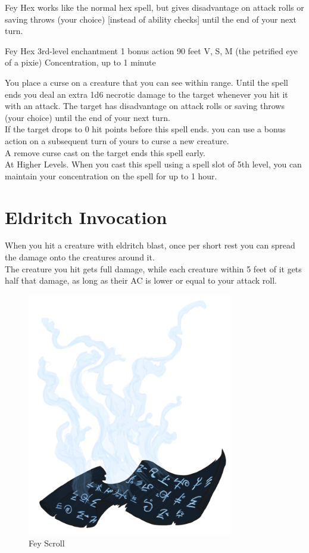 \documentclass[letter,10pt,twocolumn,openany]{dndbook}
\begin{document}
Fey Hex works like the normal hex spell, but gives disadvantage on attack rolls or saving throws (your choice) [instead of ability checks] until the end of your next turn.

\DndSpellHeader
  {Fey Hex}
  {3rd-level enchantment}
  {1 bonus action}
  {90 feet}
  {V, S, M (the petrified eye of a pixie)}
  {Concentration, up to 1 minute}

You place a curse on a creature that you can see within range. Until the spell ends you deal an extra 1d6 necrotic damage to the target whenever you hit it with an attack. The target has disadvantage on attack rolls or saving throws (your choice) until the end of your next turn.\\
If the target drops to 0 hit points before this spell ends. you can use a bonus action on a subsequent turn of yours to curse a new creature.\\
A remove curse cast on the target ends this spell early.\\
At Higher Levels. When you cast this spell using a spell slot of 5th level, you can maintain your concentration on the spell for up to 1 hour.

\section{Eldritch Invocation}


When you hit a creature with eldritch blast, once per short rest you can spread the damage onto the creatures around it.\\
The creature you hit gets full damage, while each creature within 5 feet of it gets half that damage, as long as their AC is lower or equal to your attack roll.

\begin{figure}
    \includegraphics[width=9cm]{images/fey_scroll.png}
    \caption{Fey Scroll}
\end{figure}
\end{document}
